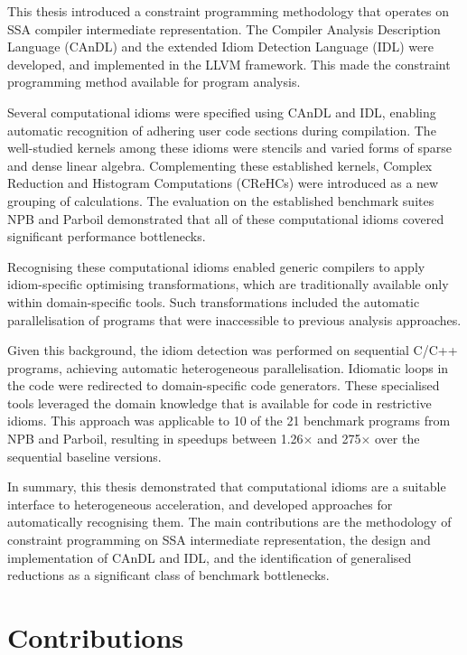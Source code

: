 
    This thesis introduced a constraint programming methodology that operates on
    SSA compiler intermediate representation.
    The Compiler Analysis Description Language (CAnDL) and the extended Idiom
    Detection Language (IDL) were developed, and implemented in the LLVM
    framework.
    This made the constraint programming method available for program analysis.

    Several computational idioms were specified using CAnDL and IDL, enabling
    automatic recognition of adhering user code sections during compilation.
    The well-studied kernels among these idioms were stencils and varied
    forms of sparse and dense linear algebra.
    Complementing these established kernels, Complex Reduction and Histogram
    Computations (CReHCs) were introduced as a new grouping of calculations.
    The evaluation on the established benchmark suites NPB and Parboil demonstrated
    that all of these computational idioms covered significant performance
    bottlenecks.

    Recognising these computational idioms enabled generic compilers to apply
    idiom-specific optimising transformations, which are traditionally available
    only within domain-specific tools.
    Such transformations included the automatic parallelisation of programs that
    were inaccessible to previous analysis approaches.

    Given this background, the idiom detection was performed on sequential C/C++
    programs, achieving automatic heterogeneous parallelisation.
    Idiomatic loops in the code were redirected to domain-specific code
    generators.
    These specialised tools leveraged the domain knowledge that is available for
    code in restrictive idioms.
    This approach was applicable to 10 of the 21 benchmark programs from NPB and
    Parboil, resulting in speedups between 1.26$\times$ and 275$\times$ over the
    sequential baseline versions.

    In summary, this thesis demonstrated that computational idioms are a
    suitable interface to heterogeneous acceleration, and developed approaches
    for automatically recognising them.
    The main contributions are the methodology of constraint programming on SSA
    intermediate representation, the design and implementation of CAnDL and IDL,
    and the identification of generalised reductions as a significant class of
    benchmark bottlenecks.

\section{Contributions}

